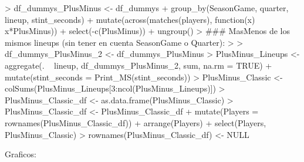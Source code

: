 \documentclass[paper=a4, fontsize=9pt]{article}
\begin{document}
\begin{Schunk}
\begin{Sinput}
> df_dummys_PlusMinus <- df_dummys %
+   group_by(SeasonGame, quarter, lineup, stint_seconds) %
+   mutate(across(matches(players), function(x) x*PlusMinus)) %
+   select(-c(PlusMinus)) %
+   ungroup()
> ### MasMenos de los mismos lineups (sin tener en cuenta SeasonGame o Quarter):
> 
> df_dummys_PlusMinus_2 <- df_dummys_PlusMinus %
> PlusMinus_Lineups <- aggregate(. ~ lineup, df_dummys_PlusMinus_2, sum, na.rm = TRUE) %
+                      mutate(stint_seconds = Print_MS(stint_seconds))
> PlusMinus_Classic <- colSums(PlusMinus_Lineups[3:ncol(PlusMinus_Lineups)])
> PlusMinus_Classic_df <- as.data.frame(PlusMinus_Classic)
> PlusMinus_Classic_df <- PlusMinus_Classic_df %
+   mutate(Players = rownames(PlusMinus_Classic_df)) %
+   arrange(Players) %
+   select(Players, PlusMinus_Classic)
> rownames(PlusMinus_Classic_df) <- NULL
\end{Sinput}
\end{Schunk}

Graficos:
\end{document}
